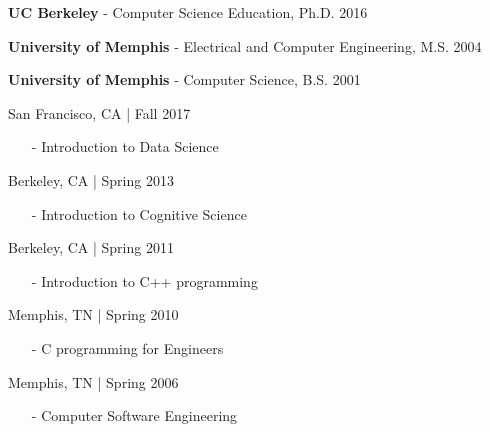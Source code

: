\documentclass[11pt,article,oneside]{memoir}
\begin{document}
\bigskip
\bigskip




\ind \textbf{UC Berkeley} - Computer Science Education, Ph.D. \hfill 2016

\ind \textbf{University of Memphis} - Electrical and Computer Engineering, M.S. \hfill 2004

\ind \textbf{University of Memphis} - Computer Science, B.S. \hfill 2001

\bigskip

\medskip

 \hfill San Francisco, CA | Fall 2017
\begin{itemize}[noitemsep,nolistsep]
\item[-] Introduction to Data Science
\end{itemize}

 \hfill Berkeley, CA | Spring 2013
\begin{itemize}[noitemsep,nolistsep] 
\item[-] Introduction to Cognitive Science
\end{itemize} 

 \hfill Berkeley, CA | Spring 2011
\begin{itemize}[noitemsep,nolistsep] 
\item[-] Introduction to C++ programming
\end{itemize} 

 \hfill Memphis, TN | Spring 2010
\begin{itemize}[noitemsep,nolistsep]
\item[-] C programming for Engineers
\end{itemize}

 \hfill Memphis, TN | Spring 2006
\begin{itemize}[noitemsep,nolistsep]
\item[-] Computer Software Engineering
\end{itemize}
\end{document}
